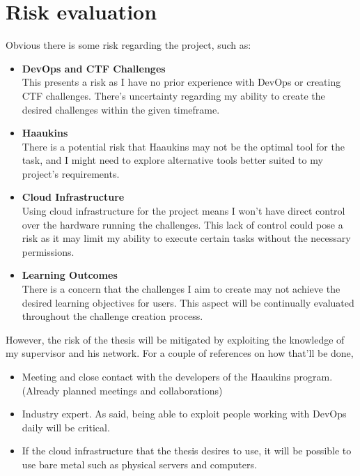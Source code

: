\documentclass[a4, 12pt]{article}
\begin{document}
\section{Risk evaluation}
Obvious there is some risk regarding the project, such as:
\begin{itemize}
    \item \textbf{DevOps and CTF Challenges}\\
        This presents a risk as I have no prior experience with DevOps or creating CTF challenges. There's uncertainty regarding my ability to create the desired challenges within the given timeframe.
        
    \item \textbf{Haaukins}\\
        There is a potential risk that Haaukins may not be the optimal tool for the task, and I might need to explore alternative tools better suited to my project's requirements.

    \item \textbf{Cloud Infrastructure}\\
        Using cloud infrastructure for the project means I won't have direct control over the hardware running the challenges. This lack of control could pose a risk as it may limit my ability to execute certain tasks without the necessary permissions.

    \item \textbf{Learning Outcomes}\\
        There is a concern that the challenges I aim to create may not achieve the desired learning objectives for users. This aspect will be continually evaluated throughout the challenge creation process.
\end{itemize}

However, the risk of the thesis will be mitigated by exploiting the knowledge of my supervisor and his network. For a couple of 
references on how that'll be done, 
\begin{itemize}
    \item Meeting and close contact with the developers of the Haaukins program. (Already planned meetings and collaborations)
    \item Industry expert. As said, being able to exploit people working with DevOps daily will be critical.
    \item If the cloud infrastructure that the thesis desires to use, it will be possible to use bare metal such as physical servers and computers.
\end{itemize}
\end{document}
